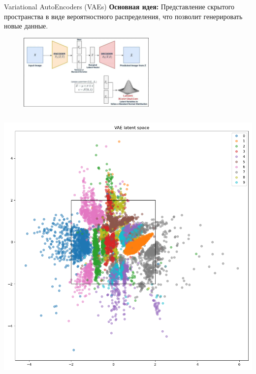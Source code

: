 \begin{frame}[allowframebreaks]{Variational AutoEncoders (VAEs)}
    \textbf{Основная идея: } Представление скрытого пространства в виде вероятностного распределения, что позволит генерировать новые данные.

    \begin{figure}
        \centering
        \includegraphics[width=0.6\textwidth]{../resources/methods/vae.png}
    \end{figure}

    \begin{columns}
        \begin{center}
            \includegraphics[width=1\textwidth]{../resources/vae/vae_latent_space_scatter.png}
        \end{center}


\end{columns}
\end{frame}

